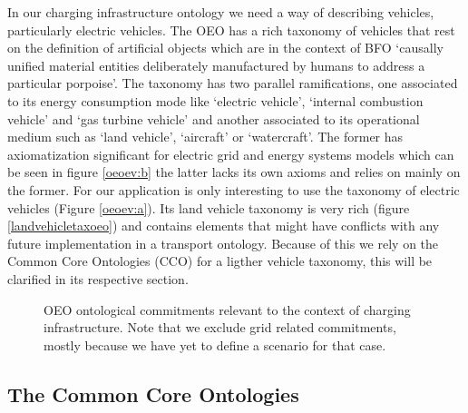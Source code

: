 In our charging infrastructure ontology we need a way of describing vehicles,
particularly electric vehicles. The OEO has a rich taxonomy of vehicles that
rest on the definition of artificial objects which are in the context of BFO
`causally unified material entities deliberately manufactured by humans to
address a particular porpoise'. The taxonomy has two parallel ramifications,
one associated to its energy consumption mode like `electric vehicle',
`internal combustion vehicle' and `gas turbine vehicle' and another associated
to its operational medium such as `land vehicle', `aircraft' or `watercraft'.
The former has axiomatization significant for electric grid and energy systems
models which can be seen in figure \ref{oeoev:b} the latter lacks its own
axioms and relies on mainly on the former. For our application is only
interesting to use the taxonomy of electric vehicles (Figure \ref{oeoev:a}).
Its land vehicle taxonomy is very rich (figure \ref{landvehicletaxoeo}) and
contains elements that might have conflicts with any future implementation in a
transport ontology. Because of this we rely on the Common Core Ontologies (CCO)
for a ligther vehicle taxonomy, this will be clarified in its respective
section.

\begin{figure}
    \centering
    \caption{OEO ontological commitments relevant to the context of charging infrastructure. Note that we exclude grid related commitments, mostly because we have yet to define a scenario for that case.}
\end{figure}

\subsection{The Common Core Ontologies}

